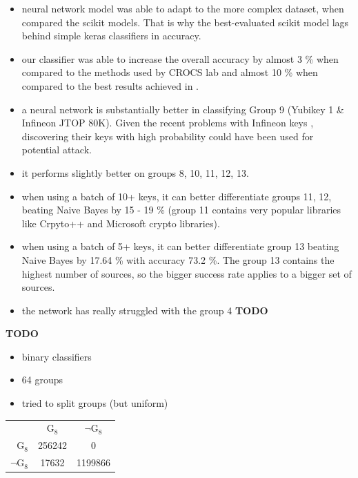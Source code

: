 \begin{itemize}

\item neural network model was able to adapt to the more complex dataset, when compared the scikit models. That is why the best-evaluated scikit model lags behind simple keras classifiers in accuracy.

\item our classifier was able to increase the overall accuracy by almost 3 \% when compared to the methods used by CROCS lab and almost 10 \% when compared to the best results achieved in \cite{thesis_sekan}.

\item a neural network is substantially better in classifying Group 9 (Yubikey 1 \& Infineon JTOP 80K). Given the recent problems with Infineon keys \cite{svenda_2}, discovering their keys with high probability could have been used for potential attack.

\item it performs slightly better on groups 8, 10, 11, 12, 13. 

\item when using a batch of 10+ keys, it can better differentiate groups 11, 12, beating Naive Bayes by 15 - 19 \% (group 11 contains very popular libraries like Crpyto++ and Microsoft crypto libraries).

\item when using a batch of 5+ keys, it can better differentiate group 13 beating Naive Bayes by 17.64 \% with accuracy 73.2 \%. The group 13 contains the highest number of sources, so the bigger success rate applies to a bigger set of sources.

\item the network has really struggled with the group 4 \textbf{TODO}

\end{itemize}





\textbf{TODO}
\begin{itemize}

\item binary classifiers
\item 64 groups
\item tried to split groups (but uniform)

\end{itemize}

\begin{tabular}{|r|c|c|}
\hline
& G$_{8}$ & $\neg$G$_{8}$ \\
G$_{8}$ & 256242 & 0 \\
$\neg$G$_{8}$ & 17632 & 1199866 \\
\hline
\end{tabular}


